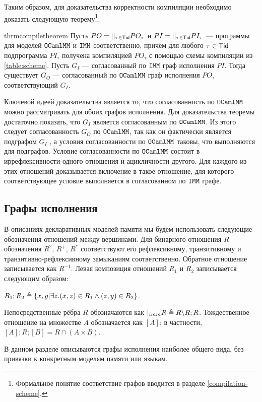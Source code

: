 Таким образом, для доказательства корректности компиляции необходимо доказать
следующую теорему\footnote{Формальное понятие соответствие графов вводится в разделе \ref{compilation-scheme}.}.

\begin{restatable}{thrm}{compiletheorem}
  \label{prop:compile-theorem}
  Пусть $PO=||_{\tau\in \mathsf{Tid}} PO_\tau$ и $PI=||_{\tau\in \mathsf{Tid}} PI_\tau$ --- программы для моделей $\mathtt{OCaml}\allowbreak \mathtt{MM}$ и $\mathtt{IMM}$ соответственно, причём для любого $\tau \in \mathsf{Tid}$ подпрограмма $PI_\tau$ получена компиляцией $PO_\tau$ с помощью схемы компиляции из \cref{table:scheme}. Пусть $G_I$ --- согласованный по $\mathtt{IMM}$ граф исполнения $PI$. Тогда существует $G_O$ --- согласованный по $\mathtt{OCaml}\allowbreak \mathtt{MM}$ граф исполнения $PO$, соответствующий $G_I$. 
\end{restatable}


Ключевой идеей доказательства является то, что согласованность по $\mathtt{OCaml}\allowbreak \mathtt{MM}$ можно рассматривать для обоих графов исполнения. Для доказательства теоремы достаточно показать, что $G_I$ является согласованным по $\mathtt{OCaml}\allowbreak \mathtt{MM}$. Из этого следует согласованность $G_O$ по $\mathtt{OCaml}\allowbreak \mathtt{MM}$, так как он фактически является подграфом $G_I$ , а условия согласованности по $\mathtt{OCaml}\allowbreak \mathtt{MM}$ таковы, что выполняются для подграфов. Условие согласованности по $\mathtt{OCaml}\allowbreak \mathtt{MM}$ состоит в иррефлексивности одного отношения и ацикличности другого. Для каждого из этих отношений доказывается включение в такое отношение, для которого соответствующее условие выполняется в согласованном по $\mathtt{IMM}$ графе.

\subsection{Графы исполнения}
\label{exec-graphs}

В описаниях декларативных моделей памяти мы будем использовать следующие обозначения отношений между вершинами. Для бинарного отношения $R$ обозначения $R^?$, $R^{+}$, $R^{*}$ соответствуют его рефлексивному, транзитивному и транзитивно-рефлексивному замыканиям соответственно. Обратное отношение записывается как $R^{-1}$. Левая композиция отношений $R_1$ и $R_2$ записывается следующим образом:

$R_1;R_2 \triangleq \{{x, y | \exists z. (x, z) \in R_1 \land (z, y) \in R_2}\}$.

Непосредственные рёбра $R$ обозначаются как $|_{imm} R \triangleq R \backslash R;R$. Тождественное отношение на множестве $A$ обозначается как $[A]$; в частности, $[A];R;[B] = R \cap (A \times B)$.

В данном разделе описываются графы исполнения наиболее общего вида, без привязки к конкретным моделям памяти или языкам. 

